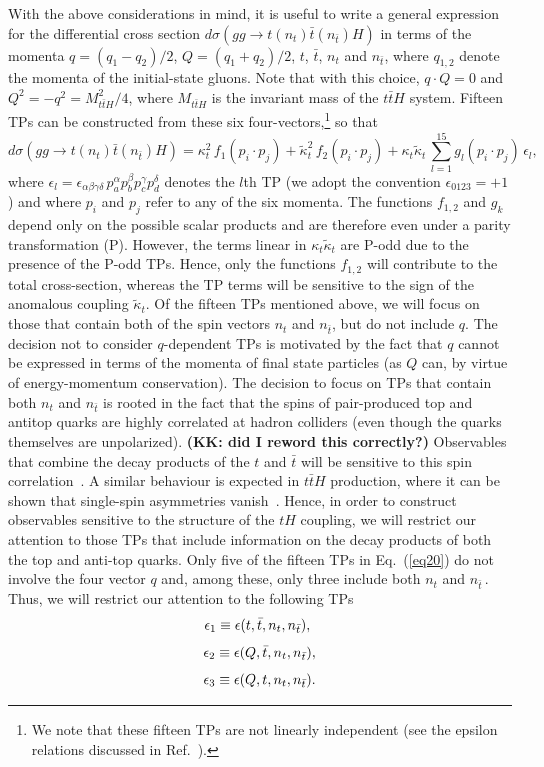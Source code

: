\documentclass[aps,preprint,tightenlines,floatfix,superscriptaddress,nofootinbib,showpacs]{revtex4-1}
\def\beq{\begin{equation}}
\def\eeq{\end{equation}}
\def\tbar{\bar{t}}
\def\kp{\kappa_t}
\def\kpt{\tilde{\kappa}_t}
\begin{document}
With the above considerations in mind, it is useful to
write a general expression for the differential cross
section $d\sigma(gg\to t(n_t)\tbar (n_{\tbar})H)$
in terms of the momenta $q=(q_1-q_2)/2$,
$Q=(q_1+q_2)/2$, $t$, $\bar{t}$, $n_t$ and $n_{\tbar}$, where
$q_{1,2}$ denote the momenta of the initial-state gluons. Note that with this
choice, $q\cdot Q=0$ and $Q^2=-q^2=M^2_{t\tbar H}/4$, where $M_{t\tbar
  H}$ is the invariant mass of the $t\tbar H$ system.
Fifteen TPs can be constructed from these six
four-vectors,\footnote{We note that these fifteen
  TPs are not linearly independent (see the epsilon relations
  discussed in Ref.~\cite{identities}).} so that
%
\beq
\label{eq20}
d\sigma(gg\to t(n_t)\tbar (n_{\tbar})H)= \kp^2\,f_1(p_i\cdot p_j)+\tilde{\kappa}^2_t\,f_2(p_i\cdot p_j)+\kp\kpt\,\sum^{15}_{l=1}g_l(p_i\cdot p_j)\,\epsilon_l,
\eeq   
%
where
$\epsilon_l=\epsilon_{\alpha\beta\gamma\delta}\,p^{\alpha}_ap^{\beta}_bp^{\gamma}_cp^{\delta}_d$
denotes the $l$th TP (we adopt the convention $\epsilon_{0123}=+1$) and where $p_i$ and $p_j$ refer to any of the
six momenta.  The
functions $f_{1,2}$ and $g_k$ depend only on the possible scalar
products and are therefore even under a parity transformation
($\mathrm{P}$). However, the terms linear in $\kp\kpt$ are
$\mathrm{P}$-odd due to the presence of the $\mathrm{P}$-odd
TPs. Hence, only the functions $f_{1,2}$ will contribute to the total
cross-section, whereas the TP terms will be sensitive to the sign of
the anomalous coupling $\kpt$. Of the fifteen TPs mentioned above,
we will focus on those that contain both of the spin
vectors $n_t$ and $n_{\tbar}$, but do not include $q$.
The decision not to consider $q$-dependent TPs is motivated by the fact
that $q$ cannot be expressed in terms of the momenta of final state
particles (as $Q$ can, by virtue of energy-momentum conservation). The
decision to focus on TPs that contain both $n_t$ and $n_{\tbar}$
is rooted in the fact that the spins of pair-produced top and antitop quarks
are highly correlated at hadron colliders 
(even though the quarks themselves are unpolarized). {\bf (KK: did I reword
  this correctly?)}
Observables that combine the decay products of the
$t$ and $\tbar$ will be sensitive to this spin
correlation~\cite{Bernreuther}.  A similar behaviour is expected in $t\tbar H$
production, where it can be shown that single-spin asymmetries
vanish~\cite{Ellis,Biswas}. Hence, in order to construct observables
sensitive to the structure of the $tH$ coupling, we will restrict our attention
to those
TPs that include information on the decay products of both the top and
anti-top quarks. Only five of the fifteen TPs in Eq.~(\ref{eq20}) do
not involve the four vector $q$ and, among these, only three
include both $n_t$ and $n_{\tbar}\,$.  Thus, we will restrict our attention
to the following TPs
%
\beq
\label{eqa1}
\epsilon_1\equiv\epsilon(t,\tbar,n_t,n_{\tbar}),\,\,
\vspace*{1mm}
\eeq
%
\beq
\label{eqa2}
\epsilon_2\equiv\epsilon(Q,\tbar,n_t,n_{\tbar}),
\vspace*{1mm}
\eeq
%
\beq
\label{eqa3}
\epsilon_3\equiv\epsilon(Q,t,n_t,n_{\tbar}).
\vspace*{1mm}
\eeq
%
\par  
\end{document}
